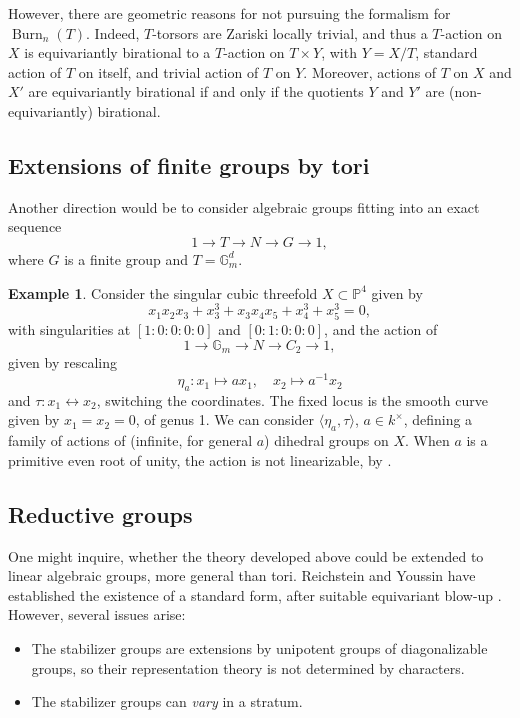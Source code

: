 \documentclass[12pt,reqno]{amsart}
\theoremstyle{plain}
\theoremstyle{remark}
\theoremstyle{definition}
\newtheorem{exam}[prop]{Example}
\numberwithin{equation}{section}
\newcommand{\bP}{{\mathbb P}}
\newcommand{\bG}{{\mathbb G}}
\DeclareMathOperator{\Burn}{Burn}
\begin{document}
However, there are geometric reasons for not pursuing the formalism for $\Burn_n(T)$. Indeed, $T$-torsors are Zariski locally trivial, and thus a $T$-action on $X$ is equivariantly birational to a $T$-action on $T\times Y$, with $Y=X/T$, standard action of $T$ on itself, 
and trivial action of $T$ on $Y$. Moreover, actions of $T$ on $X$ and $X'$ are equivariantly birational if and only if the quotients $Y$ and $Y'$ are (non-equivariantly) birational. 

\subsection*{Extensions of finite groups by tori}
Another direction would be to consider algebraic groups fitting into an exact sequence
$$
1\to T\to N\to G\to 1, 
$$
where $G$ is a finite group and $T=\bG_m^d$. 

\begin{exam}
\label{exam:cubic}
Consider the singular cubic threefold $X\subset \bP^4$ given by
$$
x_1x_2x_3+x_3^3+x_3x_4x_5+x_4^3+x_5^3=0, 
$$
with singularities at $[1:0:0:0:0]$ and $[0:1:0:0:0]$, and the action of 
$$
1\to \bG_m\to N\to C_2\to 1, 
$$
given by rescaling 
$$
\eta_a\colon x_1\mapsto a x_1, \quad x_2\mapsto a^{-1}x_2
$$ 
and $\tau\colon x_1 \leftrightarrow x_2$, switching the coordinates.  
The fixed locus  is the smooth curve given by $x_1=x_2=0$, of genus 1.  
We can consider $\langle \eta_a, \tau\rangle$, $a\in k^\times$, defining a family of actions of (infinite, for general $a$) dihedral groups on $X$. When $a$ is a primitive even root of unity, the action is not linearizable, by \cite[Prop.\ 5.17]{CMTZ}.
\end{exam}





\subsection*{Reductive groups}
\label{ss.reductive}
One might inquire, whether the theory developed above could be extended to linear algebraic groups, more general than tori.
Reichstein and Youssin have established the existence of a standard form, after suitable equivariant blow-up \cite{RYessential}.
However, several issues arise:
\begin{itemize}
\item The stabilizer groups are extensions by unipotent groups of diagonalizable groups, so their representation theory is not determined by characters.
\item The stabilizer groups can \emph{vary} in a stratum.
\end{itemize}
\end{document}
